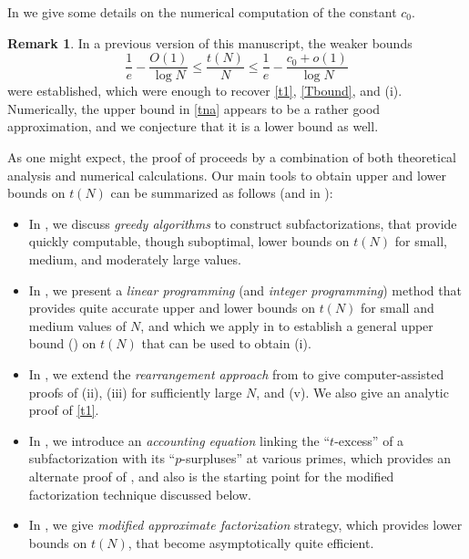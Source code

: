\documentclass[10pt,a4paper,reqno]{amsart}
\numberwithin{equation}{section}
\theoremstyle{plain}
\theoremstyle{definition}
\newtheorem{remark}[remark]{Remark}
\begin{document}
In  we give some details on the numerical computation of the constant $c_0$.

\begin{remark}\label{old} In a previous version \cite{tao} of this manuscript, the weaker bounds
  $$ \frac{1}{e} - \frac{O(1)}{\log N} \leq \frac{t(N)}{N} \leq \frac{1}{e} - \frac{c_0+o(1)}{\log N}$$
were established, which were enough to recover \eqref{t1}, \eqref{Tbound}, and (i). Numerically, the upper bound in \eqref{tna} appears to be a rather good approximation, and we conjecture that it is a lower bound as well.
\end{remark}


As one might expect, the proof of  proceeds by a combination of both theoretical analysis and numerical calculations.  Our main tools to obtain upper and lower bounds on $t(N)$ can be summarized as follows (and in ):

\begin{itemize}
  \item In , we discuss \emph{greedy algorithms} to construct subfactorizations, that provide quickly computable, though suboptimal, lower bounds on $t(N)$ for small, medium, and moderately large values.
  \item In , we present a \emph{linear programming} (and \emph{integer programming}) method that provides quite accurate upper and lower bounds on $t(N)$ for small and medium values of $N$, and which we apply in  to establish a general upper bound () on $t(N)$ that can be used to obtain (i).
  \item In , we extend the \emph{rearrangement approach} from \cite{guy-selfridge} to give computer-assisted proofs of (ii), (iii) for sufficiently large $N$, and (v).  We also give an analytic proof of \eqref{t1}.
  \item In , we introduce an \emph{accounting equation} linking the ``$t$-excess'' of a subfactorization with its ``$p$-surpluses'' at various primes, which provides an alternate proof of , and also is the starting point for the modified factorization technique discussed below.
  \item In , we give \emph{modified approximate factorization} strategy, which provides lower bounds on $t(N)$, that become asymptotically quite efficient.
\end{itemize}
\end{document}
